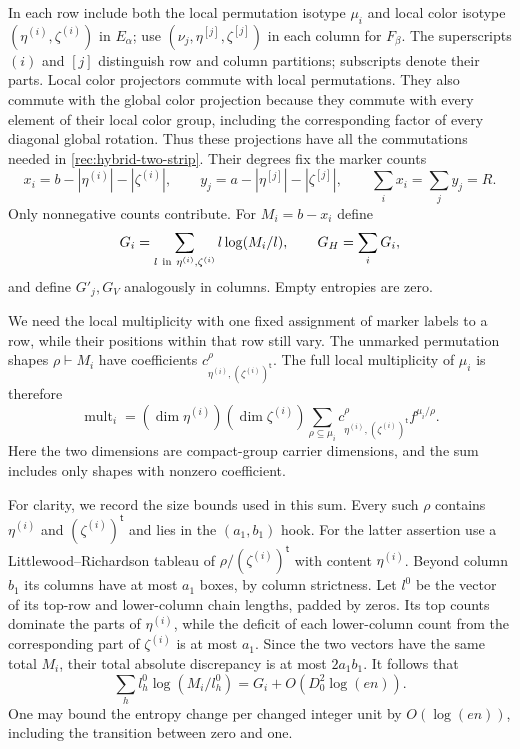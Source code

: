 In each row include both the local permutation isotype $\mu_i$
and local color isotype $(\eta^{(i)},\zeta^{(i)})$ in $E_\alpha$; use
$(\nu_j,\eta^{[j]},\zeta^{[j]})$ in each column for $F_\beta$.
The superscripts $(i)$ and $[j]$ distinguish row and column
partitions; subscripts denote their parts. Local color projectors
commute with local permutations. They also commute with the global color projection
because they commute with every element of their local color
group, including the corresponding factor of every diagonal global
rotation. Thus these projections have all the commutations needed
in \eqref{rec:hybrid-two-strip}.
Their degrees fix the marker counts
\[
 x_i=b-|\eta^{(i)}|-|\zeta^{(i)}|,\qquad
 y_j=a-|\eta^{[j]}|-|\zeta^{[j]}|,\qquad
 \sum_i x_i=\sum_jy_j=R.
\]
Only nonnegative counts contribute. For $M_i=b-x_i$ define
\[
 G_i=\sum_{l\ {\rm in}\ \eta^{(i)},\zeta^{(i)}}l\log(M_i/l),
 \qquad G_H=\sum_iG_i,
\]
and define $G'_j,G_V$ analogously in columns. Empty entropies are zero.

We need the local multiplicity with one fixed assignment of marker
labels to a row, while their positions within that row still vary.
The unmarked permutation shapes $\rho\vdash M_i$ have coefficients
$c_{\eta^{(i)},(\zeta^{(i)})^{\mathsf t}}^\rho$. The full local multiplicity
of $\mu_i$ is therefore
\begin{equation}\label{s:hybrid-local-marker-multiplicity}
 \operatorname{mult}_i
 =(\dim\eta^{(i)})(\dim\zeta^{(i)})
   \sum_{\rho\subseteq\mu_i}
    c_{\eta^{(i)},(\zeta^{(i)})^{\mathsf t}}^\rho f^{\mu_i/\rho}.
\end{equation}
Here the two dimensions are compact-group carrier dimensions, and
the sum includes only shapes with nonzero coefficient.

For clarity, we record the size bounds used in this sum. Every such
$\rho$ contains $\eta^{(i)}$ and $(\zeta^{(i)})^{\mathsf t}$ and lies in the
$(a_1,b_1)$ hook. For the latter assertion use a Littlewood--Richardson
tableau of $\rho/(\zeta^{(i)})^{\mathsf t}$ with content $\eta^{(i)}$.
Beyond column $b_1$ its columns have at most $a_1$ boxes, by column
strictness. Let $l^0$ be the vector of its top-row and lower-column
chain lengths, padded by zeros. Its top counts dominate the parts
of $\eta^{(i)}$, while the deficit of each lower-column count from the
corresponding part of $\zeta^{(i)}$ is at most $a_1$. Since the two
vectors have the same total $M_i$, their total absolute discrepancy
is at most $2a_1b_1$. It follows that
\begin{equation}\label{s:hybrid-local-chain-entropy}
 \sum_h l_h^0\log(M_i/l_h^0)
       =G_i+O(D_0^2\log(en)).
\end{equation}
One may bound the entropy change per changed integer unit by
$O(\log(en))$, including the transition between zero and one.

